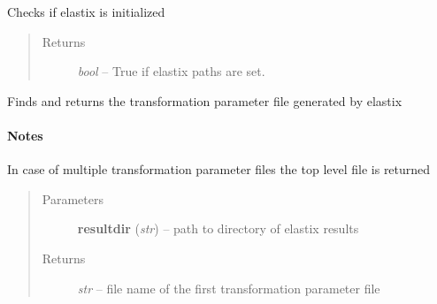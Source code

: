 \documentclass[letterpaper,10pt,english]{sphinxmanual}
\begin{document}

\begin{fulllineitems}
\label{api/ClearMap.Alignment:ClearMap.Alignment.Elastix.checkElastixInitialized}
Checks if elastix is initialized
\begin{quote}\begin{description}
\item[{Returns}] \leavevmode
\emph{bool} --
True if elastix paths are set.

\end{description}\end{quote}

\end{fulllineitems}


\begin{fulllineitems}
\label{api/ClearMap.Alignment:ClearMap.Alignment.Elastix.getTransformParameterFile}
Finds and returns the transformation parameter file generated by elastix
\paragraph{Notes}

In case of multiple transformation parameter files the top level file is returned
\begin{quote}\begin{description}
\item[{Parameters}] \leavevmode
\textbf{resultdir} (\emph{str}) --
path to directory of elastix results

\item[{Returns}] \leavevmode
\emph{str} --
file name of the first transformation parameter file

\end{description}\end{quote}

\end{fulllineitems}

\end{document}

